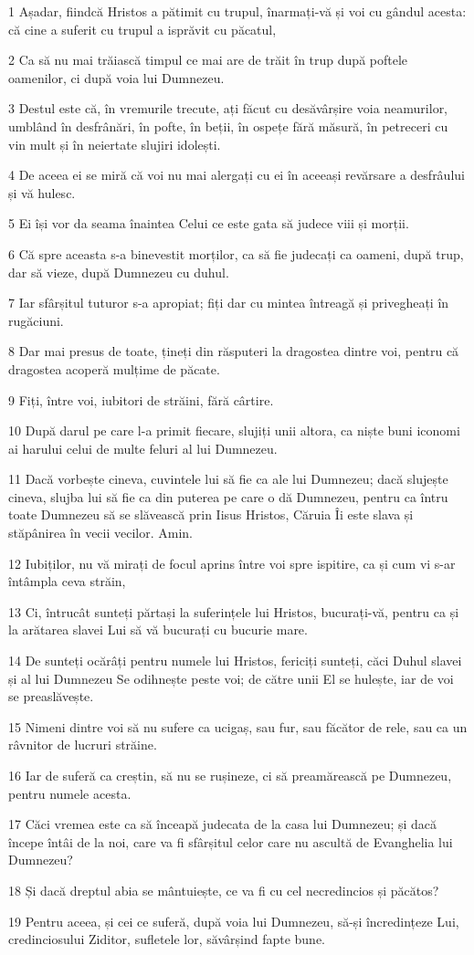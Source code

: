 \par 1 Așadar, fiindcă Hristos a pătimit cu trupul, înarmați-vă și voi cu gândul acesta: că cine a suferit cu trupul a isprăvit cu păcatul,
\par 2 Ca să nu mai trăiască timpul ce mai are de trăit în trup după poftele oamenilor, ci după voia lui Dumnezeu.
\par 3 Destul este că, în vremurile trecute, ați făcut cu desăvârșire voia neamurilor, umblând în desfrânări, în pofte, în beții, în ospețe fără măsură, în petreceri cu vin mult și în neiertate slujiri idolești.
\par 4 De aceea ei se miră că voi nu mai alergați cu ei în aceeași revărsare a desfrâului și vă hulesc.
\par 5 Ei își vor da seama înaintea Celui ce este gata să judece viii și morții.
\par 6 Că spre aceasta s-a binevestit morților, ca să fie judecați ca oameni, după trup, dar să vieze, după Dumnezeu cu duhul.
\par 7 Iar sfârșitul tuturor s-a apropiat; fiți dar cu mintea întreagă și privegheați în rugăciuni.
\par 8 Dar mai presus de toate, țineți din răsputeri la dragostea dintre voi, pentru că dragostea acoperă mulțime de păcate.
\par 9 Fiți, între voi, iubitori de străini, fără cârtire.
\par 10 După darul pe care l-a primit fiecare, slujiți unii altora, ca niște buni iconomi ai harului celui de multe feluri al lui Dumnezeu.
\par 11 Dacă vorbește cineva, cuvintele lui să fie ca ale lui Dumnezeu; dacă slujește cineva, slujba lui să fie ca din puterea pe care o dă Dumnezeu, pentru ca întru toate Dumnezeu să se slăvească prin Iisus Hristos, Căruia Îi este slava și stăpânirea în vecii vecilor. Amin.
\par 12 Iubiților, nu vă mirați de focul aprins între voi spre ispitire, ca și cum vi s-ar întâmpla ceva străin,
\par 13 Ci, întrucât sunteți părtași la suferințele lui Hristos, bucurați-vă, pentru ca și la arătarea slavei Lui să vă bucurați cu bucurie mare.
\par 14 De sunteți ocărâți pentru numele lui Hristos, fericiți sunteți, căci Duhul slavei și al lui Dumnezeu Se odihnește peste voi; de către unii El se hulește, iar de voi se preaslăvește.
\par 15 Nimeni dintre voi să nu sufere ca ucigaș, sau fur, sau făcător de rele, sau ca un râvnitor de lucruri străine.
\par 16 Iar de suferă ca creștin, să nu se rușineze, ci să preamărească pe Dumnezeu, pentru numele acesta.
\par 17 Căci vremea este ca să înceapă judecata de la casa lui Dumnezeu; și dacă începe întâi de la noi, care va fi sfârșitul celor care nu ascultă de Evanghelia lui Dumnezeu?
\par 18 Și dacă dreptul abia se mântuiește, ce va fi cu cel necredincios și păcătos?
\par 19 Pentru aceea, și cei ce suferă, după voia lui Dumnezeu, să-și încredințeze Lui, credinciosului Ziditor, sufletele lor, săvârșind fapte bune.

